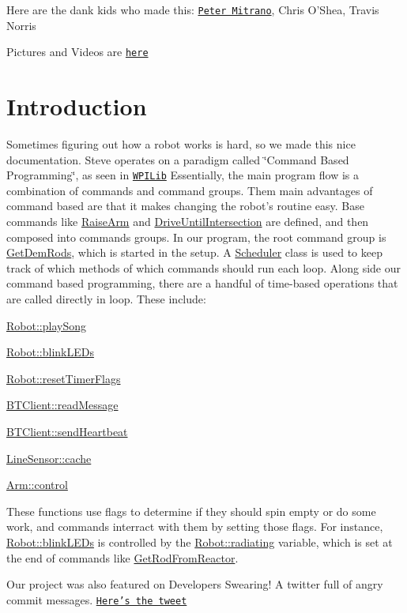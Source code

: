 Here are the dank kids who made this\-:  \href{https://petermitrano.github.io}{\tt Peter Mitrano},  Chris O'Shea,  Travis Norris

Pictures and Videos are \href{https://goo.gl/photos/xsBYmbexsEy4SRKu7}{\tt here}\hypertarget{index_Introduction}{}\section{Introduction}\label{index_Introduction}
Sometimes figuring out how a robot works is hard, so we made this nice documentation. Steve operates on a paradigm called \char`\"{}\-Command Based Programming\char`\"{}, as seen in \href{https://wpilib.screenstepslive.com/s/4485/m/13809/l/241892-what-is-command-based-programming}{\tt W\-P\-I\-Lib} Essentially, the main program flow is a combination of commands and command groups. Them main advantages of command based are that it makes changing the robot's routine easy. Base commands like \hyperlink{classRaiseArm}{Raise\-Arm} and \hyperlink{classDriveUntilIntersection}{Drive\-Until\-Intersection} are defined, and then composed into commands groups. In our program, the root command group is \hyperlink{classGetDemRods}{Get\-Dem\-Rods}, which is started in the setup. A \hyperlink{classScheduler}{Scheduler} class is used to keep track of which methods of which commands should run each loop. Along side our command based programming, there are a handful of time-\/based operations that are called directly in loop. These include\-:
\begin{DoxyItemize}
\item \hyperlink{classRobot_ad86dbbb2ad0d065f3e4c30fd4b742e1c}{Robot\-::play\-Song}
\item \hyperlink{classRobot_a4215f7e880311c2118f387df75effaf2}{Robot\-::blink\-L\-E\-Ds}
\item \hyperlink{classRobot_ab7c87529c987ede12b934bdfc768507e}{Robot\-::reset\-Timer\-Flags}
\item \hyperlink{classBTClient_a8e827d16926d45a4b7c18dda0e59837b}{B\-T\-Client\-::read\-Message}
\item \hyperlink{classBTClient_a4bf8f58f2c83834cab585e69c55c171f}{B\-T\-Client\-::send\-Heartbeat}
\item \hyperlink{classLineSensor_afc809d2aa49426d949f76f68b0154050}{Line\-Sensor\-::cache}
\item \hyperlink{classArm_a009c19e5b213f692c24eab792cc40c47}{Arm\-::control}
\end{DoxyItemize}

These functions use flags to determine if they should spin empty or do some work, and commands interract with them by setting those flags. For instance, \hyperlink{classRobot_a4215f7e880311c2118f387df75effaf2}{Robot\-::blink\-L\-E\-Ds} is controlled by the \hyperlink{classRobot_a77f62d85ab1cf34e79c2a3acd470a4ce}{Robot\-::radiating} variable, which is set at the end of commands like \hyperlink{classGetRodFromReactor}{Get\-Rod\-From\-Reactor}.

Our project was also featured on Developers Swearing! A twitter full of angry commit messages. \href{https://twitter.com/gitlost/status/650595667237187584}{\tt Here's the tweet} 